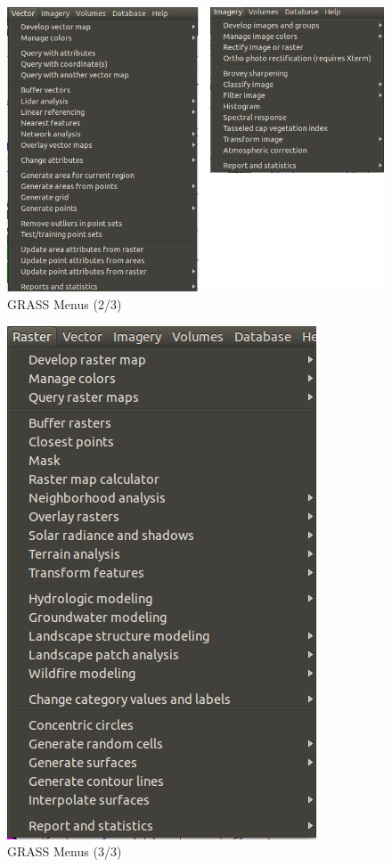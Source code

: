 \begin{figure}[htbp]
   \centering
   \includegraphics[scale=0.4]{grass026.png}
   \caption{GRASS Menus (2/3)}
   \label{fig:grass026}
\end{figure}

\begin{figure}[htbp]
   \centering
   \includegraphics[scale=0.4]{grass027.png}
   \caption{GRASS Menus (3/3)}
   \label{fig:grass027}
\end{figure}

